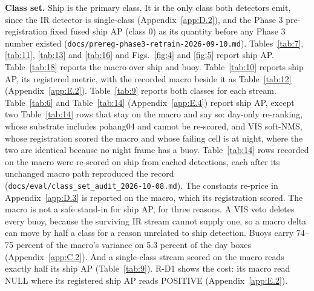 \documentclass[journal,onecolumn]{IEEEtran}
\begin{document}
\textbf{Class set.} Ship is the primary class. It is the only class both detectors emit, since the IR detector is single-class (Appendix~\ref{app:D.2}), and the Phase 3 pre-registration fixed fused ship AP (class 0) as its quantity before any Phase 3 number existed (\texttt{docs/\allowbreak{}prereg-\allowbreak{}phase3-\allowbreak{}retrain-\allowbreak{}2026-\allowbreak{}09-\allowbreak{}10.md}). Tables~\ref{tab:7}, \ref{tab:11}, \ref{tab:13} and \ref{tab:16} and Figs.~\ref{fig:4} and \ref{fig:5} report ship AP. Table~\ref{tab:18} reports the macro over ship and buoy. Table~\ref{tab:10} reports ship AP, its registered metric, with the recorded macro beside it as Table~\ref{tab:12} (Appendix~\ref{app:E.2}). Table~\ref{tab:9} reports both classes for each stream. Table~\ref{tab:6} and Table~\ref{tab:14} (Appendix~\ref{app:E.4}) report ship AP, except two Table~\ref{tab:14} rows that stay on the macro and say so: day-only re-ranking, whose substrate includes pohang04 and cannot be re-scored, and VIS soft-NMS, whose registration scored the macro and whose failing cell is at night, where the two are identical because no night frame has a buoy. Table~\ref{tab:14} rows recorded on the macro were re-scored on ship from cached detections, each after its unchanged macro path reproduced the record (\texttt{docs/\allowbreak{}eval/\allowbreak{}class\_\allowbreak{}set\_\allowbreak{}audit\_\allowbreak{}2026-\allowbreak{}10-\allowbreak{}08.md}). The constants re-price in Appendix~\ref{app:D.3} is reported on the macro, which its registration scored. The macro is not a safe stand-in for ship AP, for three reasons. A VIS veto deletes every buoy, because the surviving IR stream cannot supply one, so a macro delta can move by half a class for a reason unrelated to ship detection. Buoys carry 74--75 percent of the macro's variance on 5.3 percent of the day boxes (Appendix~\ref{app:C.2}). And a single-class stream scored on the macro reads exactly half its ship AP (Table~\ref{tab:9}). R-D1 shows the cost: its macro read NULL where its registered ship AP reads POSITIVE (Appendix~\ref{app:E.2}).
\end{document}
